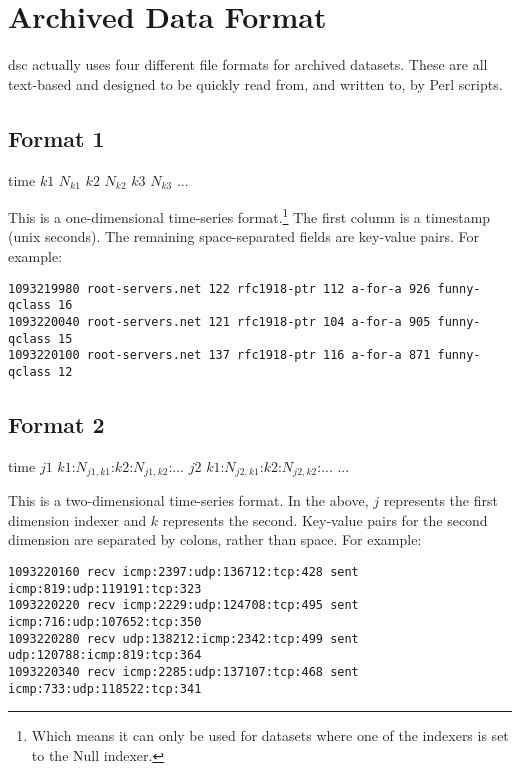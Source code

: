 \documentclass{report}
\def\dsc{{\sc dsc}}
\begin{document}
\section{Archived Data Format}

{\dsc} actually uses four different file formats for archived
datasets.  These are all text-based and designed to be quickly
read from, and written to, by Perl scripts.  

\subsection{Format 1}

\noindent
\begin{tt}time $k1$ $N_{k1}$ $k2$ $N_{k2}$ $k3$ $N_{k3}$ ...
\end{tt}

\vspace{1ex}\noindent
This is a one-dimensional time-series format.\footnote{Which means
it can only be used for datasets where one of the indexers is set
to the Null indexer.}  The first column is a timestamp (unix seconds).
The remaining space-separated fields are key-value pairs.  For
example:

\begin{footnotesize}\begin{verbatim}
1093219980 root-servers.net 122 rfc1918-ptr 112 a-for-a 926 funny-qclass 16
1093220040 root-servers.net 121 rfc1918-ptr 104 a-for-a 905 funny-qclass 15
1093220100 root-servers.net 137 rfc1918-ptr 116 a-for-a 871 funny-qclass 12
\end{verbatim}\end{footnotesize}

\subsection{Format 2}

\noindent
\begin{tt}time $j1$ $k1$:$N_{j1,k1}$:$k2$:$N_{j1,k2}$:... $j2$ $k1$:$N_{j2,k1}$:$k2$:$N_{j2,k2}$:... ...
\end{tt}

\vspace{1ex}\noindent
This is a two-dimensional time-series format.  In the above,
$j$ represents the first dimension indexer and $k$ represents
the second.  Key-value pairs for the second dimension are
separated by colons, rather than space.  For example:

\begin{footnotesize}\begin{verbatim}
1093220160 recv icmp:2397:udp:136712:tcp:428 sent icmp:819:udp:119191:tcp:323
1093220220 recv icmp:2229:udp:124708:tcp:495 sent icmp:716:udp:107652:tcp:350
1093220280 recv udp:138212:icmp:2342:tcp:499 sent udp:120788:icmp:819:tcp:364
1093220340 recv icmp:2285:udp:137107:tcp:468 sent icmp:733:udp:118522:tcp:341
\end{verbatim}\end{footnotesize}
\end{document}
